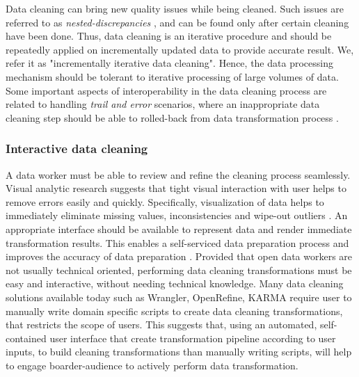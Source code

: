 Data cleaning can bring new quality issues  while being cleaned. Such issues are referred to as \textit{nested-discrepancies },\cite{journals/corr/KrishnanW0FG16} and can be found only after certain cleaning have been done. Thus, data cleaning is an iterative procedure \cite{Wisteria} and should be repeatedly applied on incrementally updated data to provide accurate result. We, refer it as "incrementally iterative data cleaning". Hence, the data processing mechanism should be tolerant to iterative processing of large volumes of data. Some important aspects of interoperability in the data cleaning process are related to handling \textit{trail and error} scenarios, where an inappropriate data cleaning step should be able to rolled-back from data transformation process \cite{visualizationsandtransformationsinwrangling}. 

\subsubsection{Interactive data cleaning}

\noindent A data worker must be able to review and refine the cleaning process seamlessly. Visual analytic research \cite{Keim08visualanalytics:} suggests that tight visual interaction with user helps to remove errors easily and quickly. Specifically, visualization of data helps to immediately eliminate missing values, inconsistencies and wipe-out outliers \cite{visualizationsandtransformationsinwrangling}. An appropriate interface should be available to represent data and render immediate transformation results. This enables a self-serviced data preparation process and improves the accuracy of data preparation \cite{journals/corr/KrishnanW0FG16}. Provided that open data workers are not usually technical oriented, performing data cleaning transformations must be easy and interactive, without needing technical knowledge. Many data cleaning solutions available today such as Wrangler, OpenRefine, KARMA require user to manually write domain specific scripts to create data cleaning transformations, that restricts the scope of users. This suggests that, using an automated, self-contained user interface that create transformation pipeline according to user inputs, to build cleaning transformations than manually writing scripts, will help to engage boarder-audience to actively perform data transformation.
